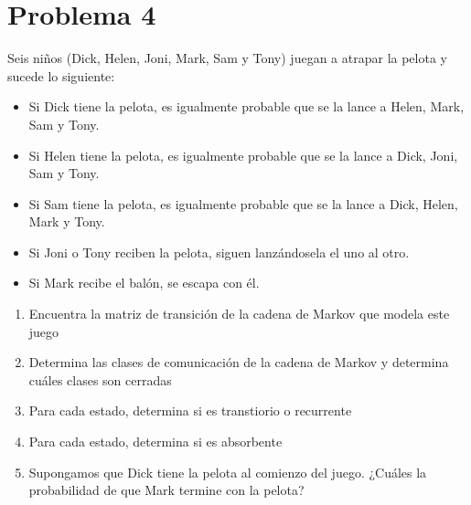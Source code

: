 \documentclass[a4paper,12pt]{article}
\begin{document}
\section{Problema 4}
Seis niños (Dick, Helen, Joni, Mark,
Sam y Tony) juegan a atrapar la pelota y sucede lo siguiente:
\begin{itemize}
    \item Si Dick tiene la pelota, es igualmente probable que se la lance a Helen, Mark, Sam y Tony.
    \item Si Helen tiene la pelota, es igualmente probable que se la lance a Dick, Joni, Sam y Tony.
    \item Si Sam tiene la pelota, es igualmente probable que se la lance a Dick, Helen, Mark y Tony.
    \item Si Joni o Tony reciben la pelota, siguen lanzándosela el uno al otro.
    \item Si Mark recibe el balón, se escapa con él.
\end{itemize}
\begin{enumerate}
    \item Encuentra la matriz de transición de la cadena de Markov que modela este juego
    \item Determina las clases de comunicación de la cadena de Markov y determina cuáles clases son cerradas
    \item Para cada estado, determina si es transtiorio o recurrente
    \item Para cada estado, determina si es absorbente
    \item Supongamos que Dick tiene la pelota al comienzo del juego. ¿Cuáles la probabilidad de que Mark termine con la pelota?
\end{enumerate}
\end{document}
